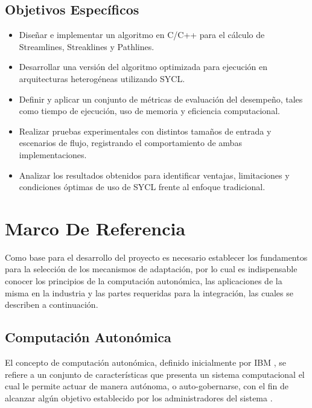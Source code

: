 \documentclass[12pt]{article}
\begin{document}
\subsection{Objetivos Específicos}

\begin{itemize}
	\item Diseñar e implementar un algoritmo en C/C++ para el cálculo de Streamlines, Streaklines y Pathlines.
	\item Desarrollar una versión del algoritmo optimizada para ejecución en arquitecturas heterogéneas utilizando SYCL.
	\item Definir y aplicar un conjunto de métricas de evaluación del desempeño, tales como tiempo de ejecución, uso de memoria y eficiencia computacional.
	\item Realizar pruebas experimentales con distintos tamaños de entrada y escenarios de flujo, registrando el comportamiento de ambas implementaciones.
	\item Analizar los resultados obtenidos para identificar ventajas, limitaciones y condiciones óptimas de uso de SYCL frente al enfoque tradicional.
\end{itemize}


\section{Marco De Referencia}

Como base para el desarrollo del proyecto es necesario establecer los fundamentos para la selección de los mecanismos de adaptación, por lo cual es indispensable conocer los principios de la computación autonómica, las aplicaciones de la misma en la industria y las partes requeridas para la integración, las cuales se describen a continuación.

\subsection{Computación Autonómica}


El concepto de computación autonómica, definido inicialmente por IBM \citeyear{horn_2001}, se refiere a un conjunto de características que presenta un sistema computacional el cual le permite actuar de manera autónoma, o auto-gobernarse, con el fin de alcanzar algún objetivo establecido por los administradores del sistema \cite{lalanda_diaconescu_mccann_2014}.
\end{document}
